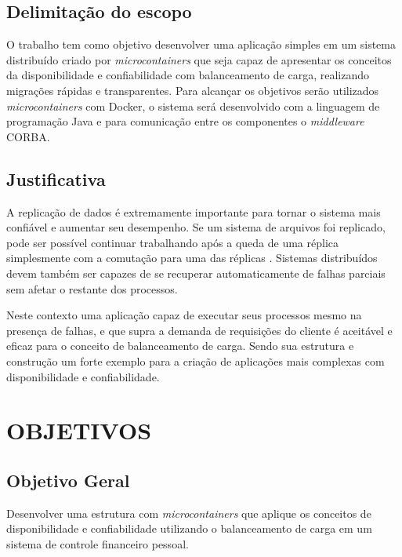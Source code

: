 \subsection{Delimitação do escopo}
	O trabalho tem como objetivo desenvolver uma aplicação simples em um sistema distribuído criado por \textit{microcontainers} que seja capaz de apresentar os conceitos da disponibilidade e confiabilidade com balanceamento de carga, realizando migrações rápidas e transparentes. Para alcançar os objetivos serão utilizados \textit{microcontainers} com Docker, o sistema será desenvolvido com a linguagem de programação Java e para comunicação entre os componentes o \textit{middleware} CORBA.
	
\subsection{Justificativa}
	A replicação de dados é extremamente importante para tornar o sistema mais confiável e aumentar seu desempenho. Se um sistema de arquivos foi replicado, pode ser possível continuar trabalhando após a queda de uma réplica simplesmente com a comutação para uma das réplicas \cite{Tanenbaum}. Sistemas distribuídos devem também ser capazes de se recuperar automaticamente de falhas parciais sem afetar o restante dos processos.
	
	Neste contexto uma aplicação capaz de executar seus processos mesmo na presença de falhas, e que supra a demanda de requisições do cliente é aceitável e eficaz para o conceito de balanceamento de carga. Sendo sua estrutura e construção um forte exemplo para a criação de aplicações mais complexas com disponibilidade e confiabilidade.
	
\section{OBJETIVOS}
\subsection{Objetivo Geral}
	Desenvolver uma estrutura com \textit{microcontainers} que aplique os conceitos de disponibilidade e confiabilidade utilizando o balanceamento de carga em um sistema de controle financeiro pessoal.
	
